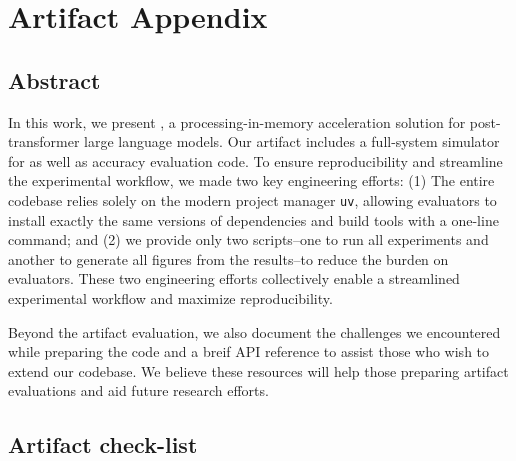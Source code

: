 \appendix

\section{Artifact Appendix}

\subsection{Abstract}
%
In this work, we present \sysname{}, a processing-in-memory
acceleration solution for post-transformer large language models.
%
Our artifact includes a full-system simulator for \sysname{} as well as
accuracy evaluation code.
%
To ensure reproducibility and streamline the experimental workflow,
we made two key engineering efforts:
%
(1) The entire codebase relies solely on the modern project manager
\texttt{uv}, allowing evaluators to install exactly the same versions
of dependencies and build tools with a one-line command; and
%
(2) we provide only two scripts--one to run all experiments and
another to generate all figures from the results--to reduce the burden
on evaluators.
%
These two engineering efforts collectively enable a streamlined
experimental workflow and maximize reproducibility.
%

%
Beyond the artifact evaluation, we also document the challenges we
encountered while preparing
the code and a breif API reference to assist those who wish to extend
our codebase.
%
We believe these resources will help those preparing artifact
evaluations and aid future research efforts.
%

\subsection{Artifact check-list}

